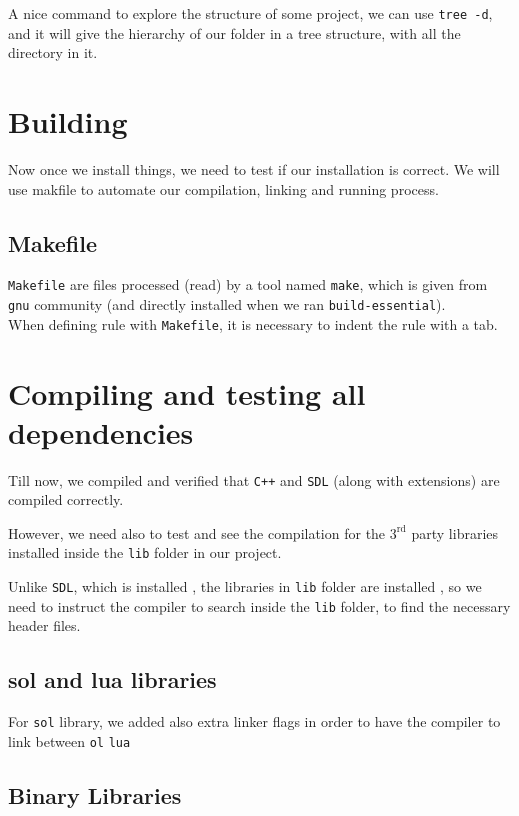 A nice command to explore the structure of some project, we can use \verb|tree -d|, and it will give the hierarchy of our folder in a tree structure, with all the directory in it.

\section{Building}

Now once we install things, we need to test if our installation is correct. We will use makfile to automate our compilation, linking and running process.

\subsection{Makefile}

\verb|Makefile| are files processed (read) by a tool named \verb|make|, which is given from \verb|gnu| community (and directly installed when we ran \verb|build-essential|).\\


When defining rule with \verb|Makefile|, it is necessary to indent the rule with a tab.


\newpage
\section{Compiling and testing all dependencies}

Till now, we compiled and verified that \verb|C++| and \verb|SDL| (along with extensions) are compiled correctly.

However, we need also to test and see the compilation for the $\mathrm{3}^\mathrm{rd}$ party libraries installed inside the \verb|lib| folder in our project. 

Unlike \verb|SDL|, which is installed , the libraries in \verb|lib| folder are installed , so we need to instruct the compiler to search inside the \verb|lib| folder, to find the necessary header files.

\subsection{sol and lua libraries}

For \verb|sol| library, we added also extra linker flags in order to have the compiler to link between \verb|ol| \verb|lua|

\subsection{Binary Libraries}

